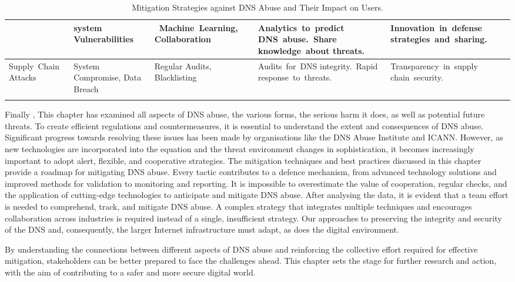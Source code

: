 {\begin{longtable}{|p{2.5cm}|p{2.5cm}|p{4cm}|p{3cm}|p{4cm}|}
{\mbox{Exploiting} Emerging \mbox{Technologies} & system \mbox{Vulnerabilities} &\mbox{ Machine Learning,} \mbox{Collaboration} & \mbox{Analytics to predict} \mbox{DNS abuse. Share} \mbox{knowledge about} \mbox{threats.} & \mbox{Innovation in defense}  \mbox{strategies and sharing.} \\ \hline

\mbox{Supply Chain} \mbox{Attacks} & \mbox{System} \mbox{Compromise,} Data Breach & Regular Audits, Blacklisting & \mbox{Audits for DNS} \mbox{integrity. Rapid} \mbox{response to threats.} & \mbox{Transparency in supply} \mbox{chain security.} \\ \hline

\caption{Mitigation Strategies against DNS Abuse and Their Impact on Users.} 

\end{longtable}

}


Finally , This chapter has examined all aspects of DNS abuse,  the various forms, the serious harm it does, as well as potential future threats. To create efficient regulations and countermeasures, it is essential to understand the extent and consequences of DNS abuse. Significant progress towards resolving these issues has been made by organisations like the DNS Abuse Institute and ICANN. However, as new technologies are incorporated into the equation and the threat environment changes in sophistication, it becomes increasingly important to adopt alert, flexible, and cooperative strategies. The mitigation techniques and best practices discussed in this chapter provide a roadmap for mitigating DNS abuse. Every tactic contributes to a defence mechanism, from advanced technology solutions and improved methods for validation to monitoring and reporting. It is impossible to overestimate the value of cooperation, regular checks, and the application of cutting-edge technologies to anticipate and mitigate DNS abuse. After analysing the data, it is evident that a team effort is needed to comprehend, track, and mitigate DNS abuse. A complex strategy that integrates multiple techniques and encourages collaboration across industries is required instead of a single, insufficient strategy. Our approaches to preserving the integrity and security of the DNS and, consequently, the larger Internet infrastructure must adapt, as does the digital environment.

By understanding the connections between different aspects of DNS abuse and reinforcing the collective effort required for effective mitigation, stakeholders can be better prepared to face the challenges ahead. This chapter sets the stage for further research and action, with the aim of contributing to a safer and more secure digital world.



